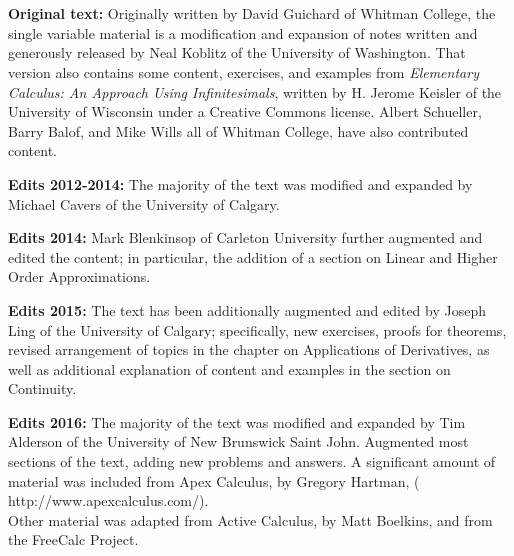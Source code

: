 \setcounter{page}{1}
\thispagestyle{empty}
\noindent {\fontsize{24pt}{22pt}\selectfont \booktitle\enskip--\enskip\booksubtitle} \\
{\large \bookauthor}

\bigskip

 \\

\setlength{\parskip}{0pt}
\noindent \textbf{Original text:} Originally written by David Guichard of Whitman College, the single variable material is a modification and expansion of notes written and generously released by Neal Koblitz  of the University of Washington. That version also contains some content, exercises, and examples from \textit{Elementary Calculus: An Approach Using Infinitesimals}, written by H. Jerome Keisler of the University of Wisconsin under a Creative Commons license. Albert Schueller, Barry Balof, and Mike Wills all of Whitman College, have also contributed content.

\medskip

\noindent \textbf{Edits 2012-2014:} The majority of the text was modified and expanded by Michael Cavers of the University of Calgary.

\medskip

\noindent \textbf{Edits 2014:} Mark Blenkinsop of Carleton University further augmented and edited the content; in particular, the addition of a section on Linear and Higher Order Approximations.

\medskip

\noindent \textbf{Edits 2015:} The text has been additionally augmented and edited by Joseph Ling of the University of Calgary; specifically, new exercises, proofs for theorems, revised arrangement of topics in the chapter on Applications of Derivatives, as well as additional explanation of content and examples in the section on Continuity.

\medskip

\noindent \textbf{Edits 2016:} The majority of the text was modified and expanded by Tim Alderson of the University of New Brunswick Saint John. Augmented most sections of the text, adding new problems and answers. A significant amount of material %
was included from Apex Calculus, by Gregory Hartman, ( http://www.apexcalculus.com/). \\
Other material %
was adapted from Active Calculus, by Matt Boelkins, and from the FreeCalc Project.   

